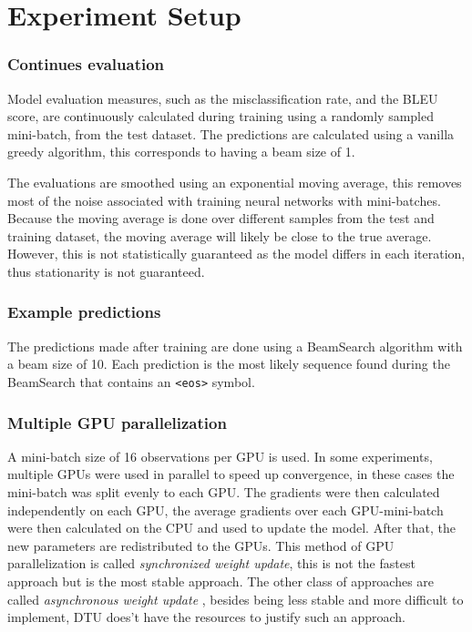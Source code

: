 
\section{Experiment Setup}

\subsubsection{Continues evaluation}
Model evaluation measures, such as the misclassification rate, and the BLEU score, are continuously calculated during training using a randomly sampled mini-batch, from the test dataset. The predictions are calculated using a vanilla greedy algorithm, this corresponds to having a beam size of 1.

The evaluations are smoothed using an exponential moving average, this removes most of the noise associated with training neural networks with mini-batches. Because the moving average is done over different samples from the test and training dataset, the moving average will likely be close to the true average. However, this is not statistically guaranteed as the model differs in each iteration, thus stationarity is not guaranteed.

\subsubsection{Example predictions}
The predictions made after training are done using a BeamSearch algorithm with a beam size of 10. Each prediction is the most likely sequence found during the BeamSearch that contains an \texttt{<eos>} symbol.

\subsubsection{Multiple GPU parallelization}
A mini-batch size of 16 observations per GPU is used. In some experiments, multiple GPUs were used in parallel to speed up convergence, in these cases the mini-batch was split evenly to each GPU. The gradients were then calculated independently on each GPU, the average gradients over each GPU-mini-batch were then calculated on the CPU and used to update the model. After that, the new parameters are redistributed to the GPUs. This method of GPU parallelization is called \textit{synchronized weight update}, this is not the fastest approach but is the most stable approach. The other class of approaches are called \textit{asynchronous weight update} \cite{async-sgd}, besides being less stable and more difficult to implement, DTU does't have the resources to justify such an approach.

